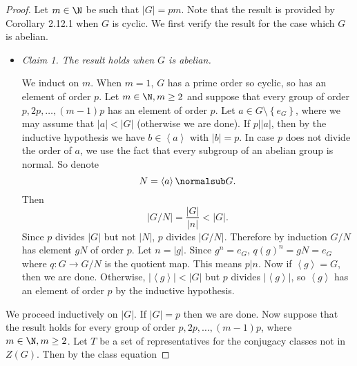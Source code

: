 \documentclass[pmath347]{subfiles}
\begin{document}
    \begin{proof}
        Let $m\in\N$ be such that $\left| G \right| = pm$. Note that the result is provided by Corollary 2.12.1 when $G$ is cyclic. We first verify the result for the case which $G$ is abelian.
        \begin{itemize}
            \item \textit{Claim 1. The result holds when $G$ is abelian.} 

                \begin{subproof}
                    We induct on $m$. When $m=1$, $G$ has a prime order so cyclic, so has an element of order $p$. Let $m\in\N, m\geq 2$ and suppose that every group of order $p, 2p, \ldots, \left( m-1 \right)p$ has an element of order $p$. Let $a\in G\setminus \left\lbrace e_G \right\rbrace$, where we may assume that $\left| a \right| < \left| G \right|$ (otherwise we are done). If $p|\left| a \right|$, then by the inductive hypothesis we have $b\in \left< a \right> $ with $\left| b \right| = p$. In case $p$ does not divide the order of $a$, we use the fact that every subgroup of an abelian group is normal. So denote
                    \begin{equation*}
                        N = \left< a \right> \normalsub G. 
                    \end{equation*}
                    Then
                    \begin{equation*}
                        \left| G /N \right| = \frac{\left| G \right| }{\left| n \right| } < \left| G \right| .
                    \end{equation*}
                    Since $p$ divides $\left| G \right|$ but not $\left| N \right|$, $p$ divides $\left| G /N \right|$. Therefore by induction $G /N$ has element $gN$ of order $p$. Let $n=\left| g \right|$. Since $g^n = e_G$, $q\left( g \right) ^n = gN = e_G$ where $q:G\to G /N$ is the quotient map. This means $p|n$. Now if $\left< g \right> = G$, then we are done. Otherwise, $\left| \left< g \right>   \right| < \left| G \right|$ but $p$ divides $\left| \left< g \right>   \right|$, so $\left< g \right>$ has an element of order $p$ by the inductive hypothesis. 
                \end{subproof}
        \end{itemize} 
        We proceed inductively on $\left| G \right|$. If $\left| G \right| = p$ then we are done. Now suppose that the result holds for every group of order $p, 2p, \ldots, \left( m-1 \right) p$, where $m\in\N, m\geq 2$. Let $T$ be a set of representatives for the conjugacy classes not in $Z\left( G \right)$. Then by the class equation

\end{proof}
\end{document}
